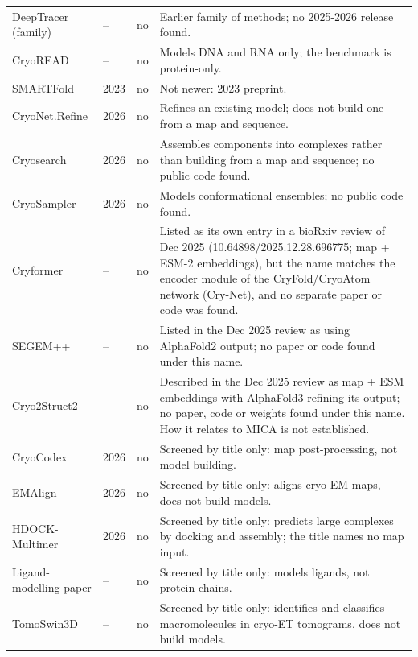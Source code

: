 \begin{longtable}{@{}p{3.0cm}p{0.9cm}p{1.5cm}p{9.0cm}@{}}
DeepTracer (family) & -- & no & {\footnotesize Earlier family of methods; no 2025-2026 release found.} \\
CryoREAD & -- & no & {\footnotesize Models DNA and RNA only; the benchmark is protein-only.} \\
SMARTFold & 2023 & no & {\footnotesize Not newer: 2023 preprint.} \\
CryoNet.Refine & 2026 & no & {\footnotesize Refines an existing model; does not build one from a map and sequence.} \\
Cryosearch & 2026 & no & {\footnotesize Assembles components into complexes rather than building from a map and sequence; no public code found.} \\
CryoSampler & 2026 & no & {\footnotesize Models conformational ensembles; no public code found.} \\
Cryformer & -- & no & {\footnotesize Listed as its own entry in a bioRxiv review of Dec 2025 (10.64898/2025.12.28.696775; map + ESM-2 embeddings), but the name matches the encoder module of the CryFold/CryoAtom network (Cry-Net), and no separate paper or code was found.} \\
SEGEM++ & -- & no & {\footnotesize Listed in the Dec 2025 review as using AlphaFold2 output; no paper or code found under this name.} \\
Cryo2Struct2 & -- & no & {\footnotesize Described in the Dec 2025 review as map + ESM embeddings with AlphaFold3 refining its output; no paper, code or weights found under this name. How it relates to MICA is not established.} \\
CryoCodex & 2026 & no & {\footnotesize Screened by title only: map post-processing, not model building.} \\
EMAlign & 2026 & no & {\footnotesize Screened by title only: aligns cryo-EM maps, does not build models.} \\
HDOCK-Multimer & 2026 & no & {\footnotesize Screened by title only: predicts large complexes by docking and assembly; the title names no map input.} \\
Ligand-modelling paper & -- & no & {\footnotesize Screened by title only: models ligands, not protein chains.} \\
TomoSwin3D & -- & no & {\footnotesize Screened by title only: identifies and classifies macromolecules in cryo-ET tomograms, does not build models.} \\
\end{longtable}
